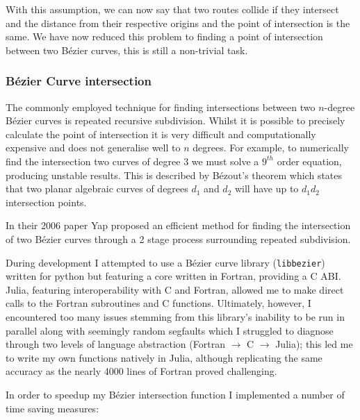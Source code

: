 With this assumption, we can now say that two routes collide if they intersect and the distance from their respective origins and the point of intersection is the same. We have now reduced this problem to finding a point of intersection between two Bézier curves, this is still a non-trivial task.

\subsubsection{Bézier Curve intersection}

The commonly employed technique for finding intersections between two $n$-degree Bézier curves is repeated recursive subdivision. Whilst it is possible to precisely calculate the point of intersection it is very difficult and computationally expensive and does not generalise well to $n$ degrees. For example, to numerically find the intersection two curves of degree 3 we must solve a $9^{th}$ order equation, producing unstable results. This is described by Bézout's theorem which states that two planar algebraic curves of degrees $d_{1}$ and $d_{2}$ will have up to $d_{1}d_{2}$ intersection points.

In their 2006 paper Yap\cite{yapCompleteSubdivisionAlgorithms2006} proposed an efficient method for finding the intersection of two Bézier curves through a 2 stage process surrounding repeated subdivision.

During development I attempted to use a Bézier curve library (\texttt{libbezier})\cite{Hermes2017} written for python but featuring a core written in Fortran, providing a C ABI. Julia, featuring interoperability with C and Fortran, allowed me to make direct calls to the Fortran subroutines and C functions. Ultimately, however, I encountered too many issues stemming from this library's inability to be run in parallel along with seemingly random segfaults which I struggled to diagnose through two levels of language abstraction (Fortran $\rightarrow$ C $\rightarrow$ Julia); this led me to write my own functions natively in Julia, although replicating the same accuracy as the nearly 4000 lines of Fortran proved challenging.

In order to speedup my Bézier intersection function I implemented a number of time saving measures:

